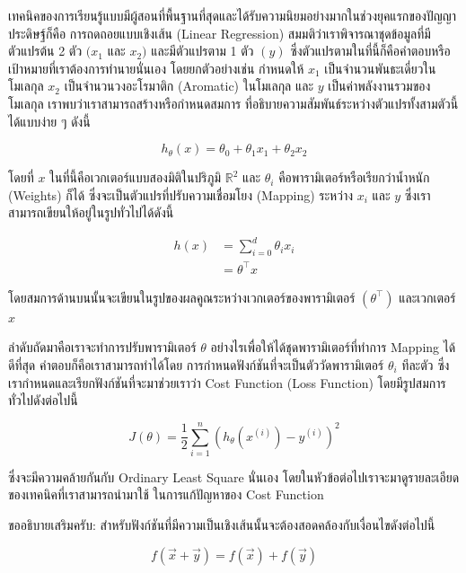 เทคนิคของการเรียนรู้แบบมีผู้สอนที่พื้นฐานที่สุดและได้รับความนิยมอย่างมากในช่วงยุคแรกของปัญญาประดิษฐ์ก็คือ การถดถอยแบบเชิงเส้น
(Linear Regression) สมมติว่าเราพิจารณาชุดข้อมูลที่มีตัวแปรต้น 2 ตัว $(x_{1}$ และ $x_{2})$ และมีตัวแปรตาม 1 ตัว $(y)$
ซึ่งตัวแปรตามในที่นี้ก็คือคำตอบหรือเป้าหมายที่เราต้องการทำนายนั่นเอง โดยยกตัวอย่างเช่น กำหนดให้ $x_{1}$ เป็นจำนวนพันธะเดี่ยวในโมเลกุล
$x_{2}$ เป็นจำนวนวงอะโรมาติก (Aromatic) ในโมเลกุล และ $y$ เป็นค่าพลังงานรวมของโมเลกุล เราพบว่าเราสามารถสร้างหรือกำหนดสมการ%
ที่อธิบายความสัมพันธ์ระหว่างตัวแปรทั้งสามตัวนี้ได้แบบง่าย ๆ ดังนี้

\begin{equation}
    h_\theta(x) = \theta_0 + \theta_1 x_1 + \theta_2 x_2
\end{equation}

\noindent โดยที่ $x$ ในที่นี้คือเวกเตอร์แบบสองมิติในปริภูมิ $\mathbb{R}^{2}$ และ $\theta_{i}$ คือพารามิเตอร์หรือเรียกว่าน้ำหนัก
(Weights) ก็ได้ ซึ่งจะเป็นตัวแปรที่ปรับความเชื่อมโยง (Mapping) ระหว่าง $x_{i}$ และ $y$ ซึ่งเราสามารถเขียนให้อยู่ในรูปทั่วไปได้ดังนี้

\begin{align}
    h(x) & = \sum_{i=0}^{d} \theta_{i} x_{i} \\
         & = \theta^{\top} x
\end{align}

\noindent โดยสมการด้านบนนั้นจะเขียนในรูปของผลคูณระหว่างเวกเตอร์ของพารามิเตอร์ $(\theta^{\top})$ และเวกเตอร์ $x$

ลำดับถัดมาคือเราจะทำการปรับพารามิเตอร์ $\theta$ อย่างไรเพื่อให้ได้ชุดพารามิเตอร์ที่ทำการ Mapping ได้ดีที่สุด คำตอบก็คือเราสามารถทำได้โดย%
การกำหนดฟังก์ชันที่จะเป็นตัววัดพารามิเตอร์ $\theta_{i}$ ทีละตัว ซึ่งเรากำหนดและเรียกฟังก์ชันที่จะมาช่วยเราว่า Cost Function (Loss Function)
โดยมีรูปสมการทั่วไปดังต่อไปนี้

\begin{equation}
    J(\theta) = \frac 1 2 \sum_{i=1}^n \left( h_\theta(x^{(i)}) - y^{(i)} \right)^2
\end{equation}

\noindent ซึ่งจะมีความคล้ายกันกับ Ordinary Least Square นั่นเอง โดยในหัวข้อต่อไปเราจะมาดูรายละเอียดของเทคนิคที่เราสามารถนำมาใช้%
ในการแก้ปัญหาของ Cost Function

ขออธิบายเสริมครับ: สำหรับฟังก์ชันที่มีความเป็นเชิงเส้นนั้นจะต้องสอดคล้องกับเงื่อนไขดังต่อไปนี้

\begin{equation}
    f(\vec{x} + \vec{y}) = f(\vec{x}) + f(\vec{y})
\end{equation}

